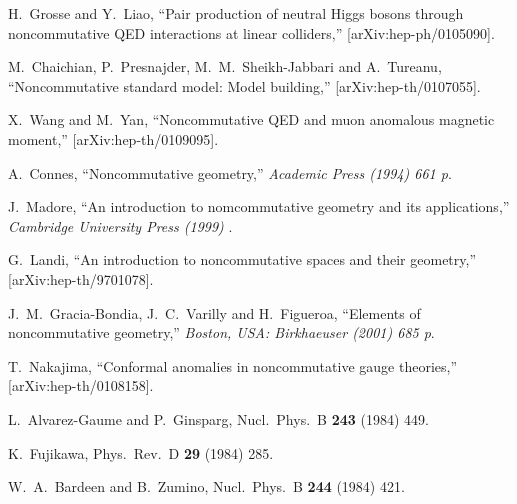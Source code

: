 \documentclass[a4paper,12pt]{article}
\begin{document}
\begin{thebibliography}{99}
H.~Grosse and Y.~Liao,
``Pair production of neutral Higgs bosons through noncommutative QED  interactions at linear colliders,''
[arXiv:hep-ph/0105090].



M.~Chaichian, P.~Presnajder, M.~M.~Sheikh-Jabbari and A.~Tureanu,
``Noncommutative standard model: Model building,''
[arXiv:hep-th/0107055].


X.~Wang and M.~Yan,
``Noncommutative QED and muon anomalous magnetic moment,''
[arXiv:hep-th/0109095].




A.~Connes,
``Noncommutative geometry,''
{\it  Academic Press (1994) 661 p}.

J.~Madore,
``An introduction to nomcommutative geometry and its applications,''
{\it  Cambridge University Press (1999) }.


G.~Landi,
``An introduction to noncommutative spaces and their geometry,''
[arXiv:hep-th/9701078].

J.~M.~Gracia-Bondia, J.~C.~Varilly and H.~Figueroa,
``Elements of noncommutative geometry,''
{\it  Boston, USA: Birkhaeuser (2001) 685 p}.


T.~Nakajima,
``Conformal anomalies in noncommutative gauge theories,''
[arXiv:hep-th/0108158].




L.~Alvarez-Gaume and P.~Ginsparg,
Nucl.\ Phys.\ B {\bf 243} (1984) 449.

K.~Fujikawa,
Phys.\ Rev.\ D {\bf 29} (1984) 285.

W.~A.~Bardeen and B.~Zumino,
Nucl.\ Phys.\ B {\bf 244} (1984) 421.


\end{thebibliography}
\end{document}
